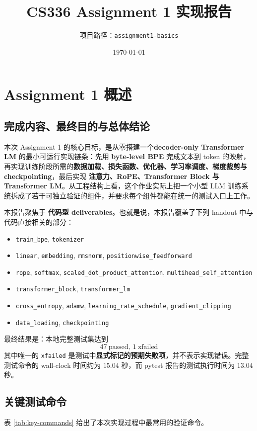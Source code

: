 \documentclass[UTF8,a4paper,11pt]{ctexart}
\title{CS336 Assignment 1 实现报告}
\author{项目路径：\texttt{assignment1-basics}}
\date{\today}
\begin{document}
\maketitle
\tableofcontents
\newpage

\section{Assignment 1 概述}

\subsection{完成内容、最终目的与总体结论}
本次 Assignment 1 的核心目标，是从零搭建一个\textbf{decoder-only Transformer LM} 的最小可运行实现链条：先用 \textbf{byte-level BPE} 完成文本到 token 的映射，再实现训练阶段所需的\textbf{数据加载、损失函数、优化器、学习率调度、梯度裁剪与 checkpointing}，最后实现 \textbf{注意力、RoPE、Transformer Block 与 Transformer LM}。从工程结构上看，这个作业实际上把一个小型 LLM 训练系统拆成了若干可独立验证的组件，并要求每个组件都能在统一的测试入口上工作。

本报告聚焦于 \textbf{代码型 deliverables}。也就是说，本报告覆盖了下列 handout 中与代码直接相关的部分：
\begin{itemize}[leftmargin=2em]
  \item \texttt{train\_bpe}, \texttt{tokenizer}
  \item \texttt{linear}, \texttt{embedding}, \texttt{rmsnorm}, \texttt{positionwise\_feedforward}
  \item \texttt{rope}, \texttt{softmax}, \texttt{scaled\_dot\_product\_attention}, \texttt{multihead\_self\_attention}
  \item \texttt{transformer\_block}, \texttt{transformer\_lm}
  \item \texttt{cross\_entropy}, \texttt{adamw}, \texttt{learning\_rate\_schedule}, \texttt{gradient\_clipping}
  \item \texttt{data\_loading}, \texttt{checkpointing}
\end{itemize}

最终结果是：本地完整测试集达到
\[
\boxed{47\ \text{passed},\ 1\ \text{xfailed}}
\]
其中唯一的 \texttt{xfailed} 是测试中\textbf{显式标记的预期失败项}，并不表示实现错误。完整测试命令的 wall-clock 时间约为 \(15.04\) 秒，而 pytest 报告的测试执行时间为 \(13.04\) 秒。

\subsection{关键测试命令}
表 \ref{tab:key-commands} 给出了本次实现过程中最常用的验证命令。
\end{document}
